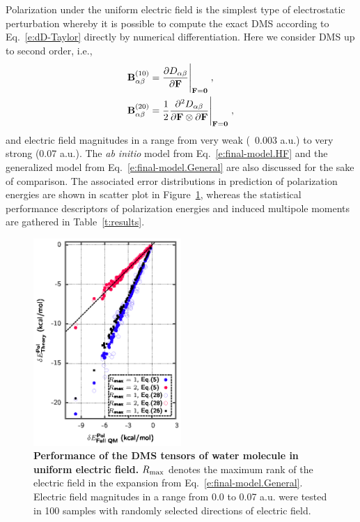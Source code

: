 \documentclass[aip,amsmath,amssymb,reprint,floatfix]{revtex4-1}
\begin{document}
Polarization under the uniform electric field is the simplest type of electrostatic perturbation
whereby it is possible to compute the exact DMS according to Eq.~\eqref{e:dD-Taylor} 
directly by numerical differentiation. Here we consider DMS up to second order, i.e.,
%
\begin{subequations}\label{e:exact-DMS}
 \begin{align}
  {\bf B}^{(10)}_{\alpha\beta} &= \frac{\partial D_{\alpha\beta}}{\partial {\bf F}}\Bigg|_{{\bf F}={\bf 0}} \;, \label{e:B10} \\
  {\bf B}^{(20)}_{\alpha\beta} &= \frac{1}{2} 
     \frac{\partial^2 D_{\alpha\beta}}{\partial {\bf F} \otimes \partial {\bf F}}\Bigg|_{{\bf F}={\bf 0}} \;, \label{e:B20}
 \end{align}
\end{subequations}
%
and electric field magnitudes in a range from very weak (~0.003 a.u.) to very strong (0.07 a.u.).
The \emph{ab initio} model from Eq.~\eqref{e:final-model.HF} and
the generalized model from Eq.~\eqref{e:final-model.General} are also discussed for the sake of comparison. 
The associated error distributions in prediction of polarization energies 
are shown in scatter plot in Figure~\ref{f:fig-1}, whereas the
statistical performance descriptors of polarization energies and induced multipole moments
are gathered in Table~\ref{t:results}.
%
\begin{figure}[h]
\includegraphics[width=0.5\textwidth]{data/dmatpol/water/figure1/fig-1.eps}
\caption{\label{f:fig-1} {\bf Performance of the DMS tensors of water molecule
in uniform electric field.} 
$R_{\rm max}$ denotes the maximum rank of the electric field
in the expansion from Eq.~\eqref{e:final-model.General}.
Electric field magnitudes in a range from 0.0 to 0.07 a.u. were tested in 100 samples with randomly selected 
directions of electric field.
} 
\end{figure}
%
\end{document}
